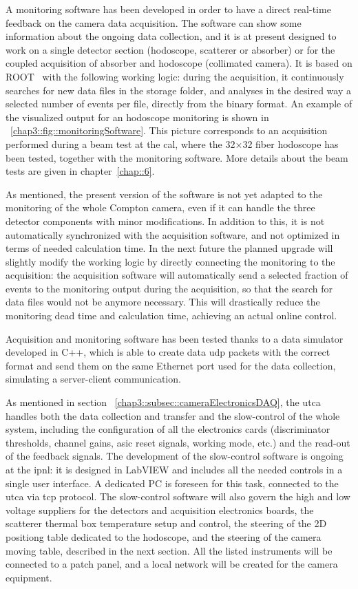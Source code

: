 A monitoring software has been developed in order to have a direct real-time feedback on the camera data acquisition. The software can show some information about the ongoing data collection, and it is at present designed to work on a single detector section (hodoscope, scatterer or absorber) or for the coupled acquisition of absorber and hodoscope (collimated camera). It is based on ROOT~\parencite{Brun1997} with the following working logic: during the acquisition, it continuously searches for new data files in the storage folder, and analyses in the desired way a selected number of events per file, directly from the binary format. An example of the visualized output for an hodoscope monitoring is shown in \figurename~\ref{chap3::fig::monitoringSoftware}. This picture corresponds to an acquisition performed during a beam test at the \gls{cal}, where the 32$\times$32 fiber hodoscope has been tested, together with the monitoring software. More details about the beam tests are given in chapter~\ref{chap::6}.

As mentioned, the present version of the software is not yet adapted to the monitoring of the whole Compton camera, even if it can handle the three detector components with minor modifications. In addition to this, it is not automatically synchronized with the acquisition software, and not optimized in terms of needed calculation time. In the next future the planned upgrade will slightly modify the working logic by directly connecting the monitoring to the acquisition: the acquisition software will automatically send a selected fraction of events to the monitoring output during the acquisition, so that the search for data files would not be anymore necessary. This will drastically reduce the monitoring dead time and calculation time, achieving an actual online control.

Acquisition and monitoring software has been tested thanks to a data simulator developed in C++, which is able to create data \gls{udp} packets with the correct format and send them on the same Ethernet port used for the data collection, simulating a server-client communication.

As mentioned in section~	\ref{chap3::subsec::cameraElectronicsDAQ}, the \gls{utca} handles both the data collection and transfer and the slow-control of the whole system, including the configuration of all the electronics cards (discriminator thresholds, channel gains, \gls{asic} reset signals, working mode, etc.) and the read-out of the feedback signals. The development of the slow-control software is ongoing at the \gls{ipnl}: it is designed in LabVIEW and includes all the needed controls in a single user interface. A dedicated PC is foreseen for this task, connected to the \gls{utca} via \gls{tcp} protocol. The slow-control software will also govern the high and low voltage suppliers for the detectors and acquisition electronics boards, the scatterer thermal box temperature setup and control, the steering of the 2D positiong table dedicated to the hodoscope, and the steering of the camera moving table, described in the next section. All the listed instruments will be connected to a patch panel, and a local network will be created for the camera equipment.      


